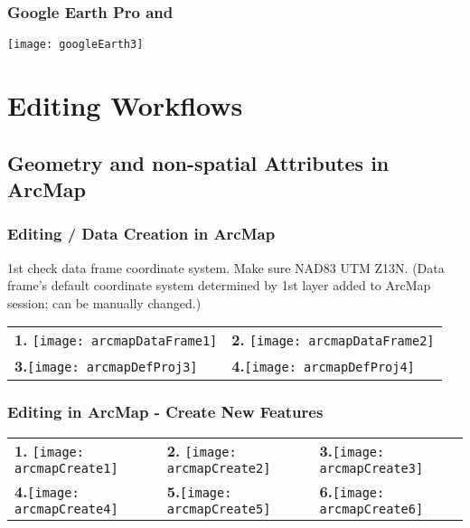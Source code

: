\documentclass[t]{beamer} %
\begin{document}

\begin{frame}
\frametitle{Google Earth Pro and }
\vspace{-0.5in}
\center
\texttt{[image: googleEarth3]}
\end{frame}


\section{Editing Workflows}
\subsection{Geometry and non-spatial Attributes in ArcMap}
\begin{frame}
\frametitle{Editing / Data Creation in ArcMap}

1st check data frame coordinate system. Make sure NAD83 UTM Z13N.
\tiny{(Data frame's default coordinate system determined by 1st layer added to ArcMap session; can be manually changed.)}
\vspace{-0.1in}
\begin{table}
\begin{tabular}{l l}
\textbf{1.} \texttt{[image: arcmapDataFrame1]} & \textbf{2.} \texttt{[image: arcmapDataFrame2]} \\
\textbf{3.}\texttt{[image: arcmapDefProj3]} & \textbf{4.}\texttt{[image: arcmapDefProj4]} \\
\end{tabular}
\end{table}

\end{frame}


\begin{frame}
\frametitle{Editing in ArcMap - Create New Features}
\vspace{-0.30in}
\begin{table}
\begin{tabular}{l l l}
\textbf{1.} \texttt{[image: arcmapCreate1]} & \textbf{2.} \texttt{[image: arcmapCreate2]} & \textbf{3.}\texttt{[image: arcmapCreate3]} \\
\textbf{4.}\texttt{[image: arcmapCreate4]} & \textbf{5.}\texttt{[image: arcmapCreate5]} & \textbf{6.}\texttt{[image: arcmapCreate6]} 
\end{tabular}
\end{table}
\end{frame}
\end{document}
